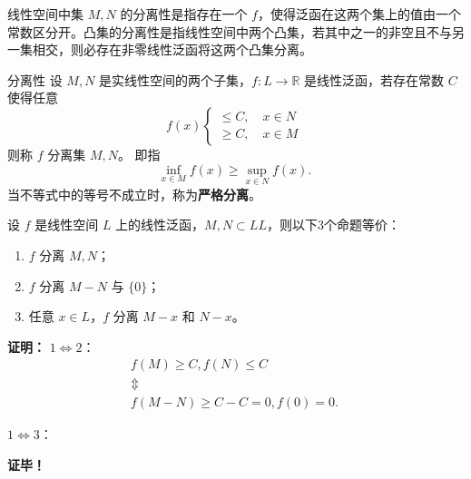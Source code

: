 

线性空间中集 $M,N$ 的分离性是指存在一个 $f$，使得泛函在这两个集上的值由一个常数区分开。凸集的分离性是指线性空间中两个凸集，若其中之一的非空且不与另一集相交，则必存在非零线性泛函将这两个凸集分离。

\begin{definition}{分离性}
设 $M,N$ 是实线性空间的两个子集，$f:L\rightarrow\mathbb R$ 是线性泛函，若存在常数 $C$ 使得任意 
\begin{equation}
f(x)\left\{\begin{aligned}\leq C,\quad x\in N\\
\geq C,\quad x\in M
\end{aligned}\right.~
\end{equation}
则称 $f$ 分离集 $M,N$。
即指
\begin{equation}
\inf_{x\in M}f(x)\geq\sup_{x\in N}f(x).~
\end{equation}
当不等式中的等号不成立时，称为\textbf{严格分离}。
\end{definition}

\begin{theorem}{}
设 $f$ 是线性空间 $L$ 上的线性泛函，$M,N\subset LL$，则以下3个命题等价：
\begin{enumerate}
\item $f$ 分离 $M,N$；
\item $f$ 分离 $M-N$ 与 $\{0\}$；
\item 任意 $x\in L$，$f$ 分离 $M-x$ 和 $N-x$。
\end{enumerate}
\end{theorem}
\textbf{证明：}
$1\Leftrightarrow2$：
\begin{equation}
\begin{aligned}
f(M)\geq C,f(N)\leq C\\
\Updownarrow \\
f(M-N)\geq C-C=0, f(0)=0.
\end{aligned}~ 
\end{equation}



$1\Leftrightarrow3$：

\textbf{证毕！}



